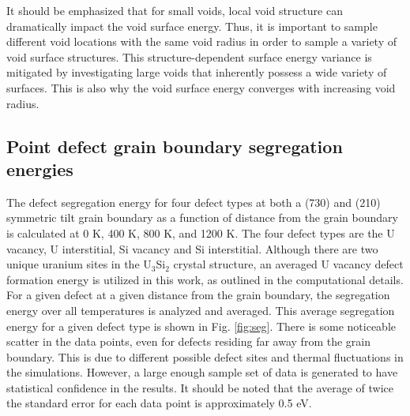 \documentclass[review]{elsarticle}
\begin{document}
It should be emphasized that for small voids, local void structure can dramatically impact the void surface energy. Thus, it is important to sample different void locations with the same void radius in order to sample a variety of void surface structures. This structure-dependent surface energy variance is mitigated by investigating large voids that inherently possess a wide variety of surfaces. This is also why the void surface energy converges with increasing void radius. 

\FloatBarrier

\subsection{Point defect grain boundary segregation energies}

The defect segregation energy for four defect types at both a (730) and (210) symmetric tilt grain boundary as a function of distance from the grain boundary is calculated at 0 K, 400 K, 800 K, and 1200 K. The four defect types are the U vacancy, U interstitial, Si vacancy and Si interstitial. Although there are two unique uranium sites in the U$_{3}$Si$_{2}$ crystal structure, an averaged U vacancy defect formation energy is utilized in this work, as outlined in the computational details. For a given defect at a given distance from the grain boundary, the segregation energy over all temperatures is analyzed and averaged. This average segregation energy for a given defect type is shown in Fig. \ref{fig:seg}. There is some noticeable scatter in the data points, even for defects residing far away from the grain boundary. This is due to different possible defect sites and thermal fluctuations in the simulations. However, a large enough sample set of data is generated to have statistical confidence in the results. It should be noted that the average of twice the standard error for each data point is approximately 0.5 eV. 
\end{document}
